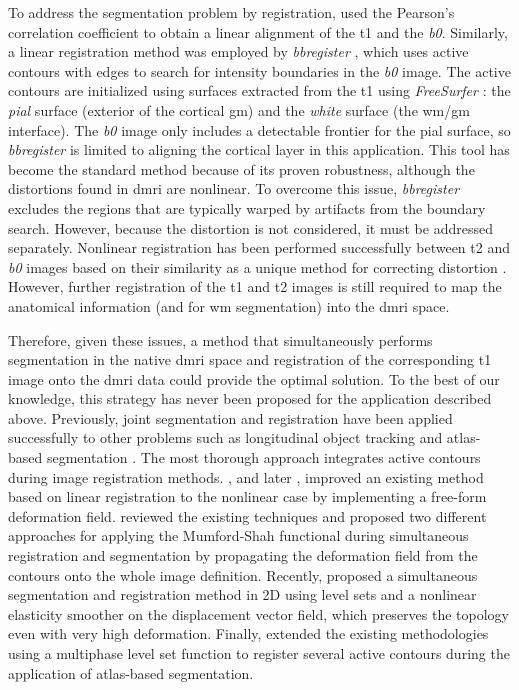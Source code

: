 To address the segmentation problem by registration, \cite{saad_new_2009}
  used the Pearson's correlation coefficient to obtain a linear alignment of the \gls*{t1} and
  the \emph{b0}.
Similarly, a linear registration method was employed by \emph{bbregister} \citep{greve_accurate_2009},
  which uses active contours with edges to search for intensity boundaries in the \emph{b0}
  image.
The active contours are initialized using surfaces extracted from the
  \gls*{t1} using \emph{FreeSurfer} \citep{fischl_freesurfer_2012}:
  the \emph{pial} surface (exterior of the cortical \gls*{gm}) and the \emph{white}
  surface (the \gls*{wm}/\gls*{gm} interface).
The \emph{b0} image only includes a detectable frontier for the pial surface, so
  \emph{bbregister} is limited to aligning the cortical layer in this
  application.
This tool has become the standard method because of its proven robustness, although the
  distortions found in \gls*{dmri} are nonlinear.
To overcome this issue, \emph{bbregister} excludes the
  regions that are typically warped by artifacts from the boundary search.
However, because the distortion is not considered, it must be addressed separately.
Nonlinear registration has been performed successfully between \gls*{t2} and \emph{b0}
  images based on their similarity as a unique method for correcting distortion
  \citep{kybic_unwarping_2000,studholme_accurate_2000,wu_comparison_2008,tao_variational_2009}.
However, further registration of the \gls*{t1} and \gls*{t2} images is still required to map the anatomical
  information (and for \gls*{wm} segmentation) into the \gls*{dmri} space.

Therefore, given these issues, a method that simultaneously performs
  segmentation in the native \gls*{dmri} space and registration of the corresponding \gls*{t1} image
  onto the \gls*{dmri} data could provide the optimal solution.
To the best of our knowledge, this strategy has never been proposed for the application described above.
Previously, joint segmentation and registration have been applied successfully to other problems
such as longitudinal object tracking \citep{paragios_level_2003} and atlas-based
  segmentation \citep{gorthi_active_2011}.
The most thorough approach integrates active contours during image registration
  methods.
\cite{unal_coupled_2005}, and later \cite{wang_joint_2006},
  improved an existing method \citep{yezzi_variational_2003} based on linear registration
  to the nonlinear case by implementing a free-form deformation field.
\cite{droske_mumfordshah_2009} reviewed the existing techniques and proposed two different
  approaches for applying the Mumford-Shah functional \citep{mumford_optimal_1989} during simultaneous
  registration and segmentation by propagating the deformation field from
  the contours onto the whole image definition.
Recently, \cite{guyader_combined_2011} proposed a simultaneous segmentation and
  registration method in 2D using level sets and a nonlinear elasticity smoother on the
  displacement vector field, which preserves the topology even with very high deformation.
Finally, \cite{gorthi_active_2011} extended the existing methodologies using a multiphase
  level set function to register several active contours during the application
  of atlas-based segmentation.

